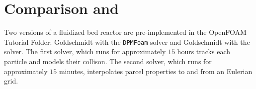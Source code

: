 \chapter{Comparison \MP and \DP}
Two versions of a fluidized bed reactor are pre-implemented in the OpenFOAM Tutorial Folder:
Goldschmidt with the \texttt{DPMFoam} solver and Goldschmidt with the  solver. 
The first solver, which runs for approximately $15$ hours tracks each particle and models their collison. The second solver, which runs for approximately $15$ minutes, interpolates parcel properties to and from an Eulerian grid.